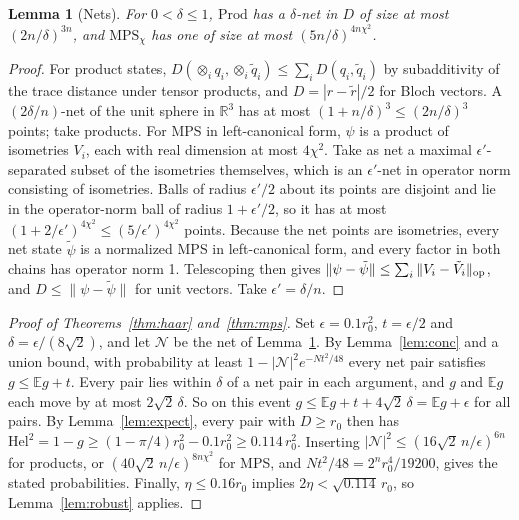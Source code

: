 \documentclass[11pt]{article}
\newtheorem{lemma}[theorem]{Lemma}
\theoremstyle{definition}
\theoremstyle{remark}
\newcommand{\Hel}{\mathrm{Hel}}
\newcommand{\Prod}{\mathrm{Prod}}
\newcommand{\MPS}{\mathrm{MPS}}
\newcommand{\E}{\mathbb{E}}
\begin{document}
\begin{lemma}[Nets]\label{lem:nets}
For $0<\delta\le1$, $\Prod$ has a $\delta$-net in $D$ of size at most $(2n/\delta)^{3n}$, and $\MPS_\chi$ has one of size at most $(5n/\delta)^{4n\chi^2}$.
\end{lemma}
\begin{proof}
For product states, $D(\otimes_i q_i,\otimes_i\tilde q_i)\le\sum_iD(q_i,\tilde q_i)$ by subadditivity of the trace distance under tensor products, and $D=|r-\tilde r|/2$ for Bloch vectors. A $(2\delta/n)$-net of the unit sphere in $\mathbb R^3$ has at most $(1+n/\delta)^3\le(2n/\delta)^3$ points; take products. For MPS in left-canonical form, $\psi$ is a product of isometries $V_i$, each with real dimension at most $4\chi^2$. Take as net a maximal $\epsilon'$-separated subset of the isometries themselves, which is an $\epsilon'$-net in operator norm consisting of isometries. Balls of radius $\epsilon'/2$ about its points are disjoint and lie in the operator-norm ball of radius $1+\epsilon'/2$, so it has at most $(1+2/\epsilon')^{4\chi^2}\le(5/\epsilon')^{4\chi^2}$ points. Because the net points are isometries, every net state $\tilde\psi$ is a normalized MPS in left-canonical form, and every factor in both chains has operator norm 1. Telescoping then gives $\|\psi-\tilde\psi\|\le\sum_i\|V_i-\tilde V_i\|_{\rm op}$, and $D\le\|\psi-\tilde\psi\|$ for unit vectors. Take $\epsilon'=\delta/n$.
\end{proof}

\begin{proof}[Proof of Theorems~\ref{thm:haar} and~\ref{thm:mps}]
Set $\epsilon=0.1r_0^2$, $t=\epsilon/2$ and $\delta=\epsilon/(8\sqrt2)$, and let $\mathcal N$ be the net of Lemma~\ref{lem:nets}. By Lemma~\ref{lem:conc} and a union bound, with probability at least $1-|\mathcal N|^2e^{-Nt^2/48}$ every net pair satisfies $g\le\E g+t$. Every pair lies within $\delta$ of a net pair in each argument, and $g$ and $\E g$ each move by at most $2\sqrt2\,\delta$. So on this event $g\le\E g+t+4\sqrt2\,\delta=\E g+\epsilon$ for all pairs. By Lemma~\ref{lem:expect}, every pair with $D\ge r_0$ then has $\Hel^2=1-g\ge(1-\pi/4)r_0^2-0.1r_0^2\ge0.114\,r_0^2$. Inserting $|\mathcal N|^2\le(16\sqrt2\,n/\epsilon)^{6n}$ for products, or $(40\sqrt2\,n/\epsilon)^{8n\chi^2}$ for MPS, and $Nt^2/48=2^nr_0^4/19200$, gives the stated probabilities. Finally, $\eta\le0.16r_0$ implies $2\eta<\sqrt{0.114}\,r_0$, so Lemma~\ref{lem:robust} applies.
\end{proof}
\end{document}
